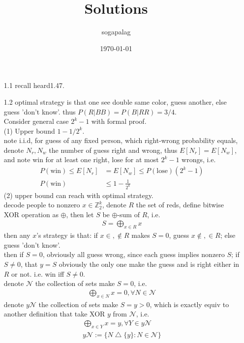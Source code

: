 \documentclass[paper=a4, fontsize=11pt]{scrartcl} %
\title{Solutions}
\author{sogapalag}
\date{\normalsize\today}
\numberwithin{equation}{section} %
\numberwithin{figure}{section} %
\numberwithin{table}{section} %
\begin{document}
\maketitle

\begin{itemize}
	\item[1.1] recall heard1.47.
	\item[1.2] optimal strategy is that one see double same color, guess another, else guess 'don't know'. thus $P(R|BB)=P(B|RR) = 3/4$.\\
	Consider general case $2^k -1$ with formal proof.\\
	(1) Upper bound $1 - 1/2^k$.\\
	note i.i.d, for guess of any fixed person, which right-wrong probability equals, denote $N_r,N_w$ the number of guess right and wrong, thus $E[N_r]=E[N_w]$, and note win for at least one right, lose for at most $2^k-1$ wrongs, i.e.
	\begin{align}
		P(\text{win}) \leq E[N_r] &= E[N_w] \leq P(\text{lose}) (2^k-1)\\
		P(\text{win}) &\leq  1 - \frac{1}{2^k}
	\end{align}
	(2) upper bound can reach with optimal strategy.\\
	decode people to nonzero $x\in \mathbb{Z}_2^k$, denote $R$ the set of reds, define bitwise XOR operation as $\oplus$, then let $S$ be $\oplus$-sum of $R$, i.e. 
	\begin{align}
		S = \bigoplus_{x\in R} x
	\end{align}
	then any $x$'s strategy is that: if $x\in,\notin R$ makes $S=0$, guess $x\notin,\in R$; else guess 'don't know'.\\
	then if $S=0$, obviously all guess wrong, since each guess implies nonzero $S$; if $S\neq 0$, that $y=S$ obviously the only one make the guess and is right either in $R$ or not. i.e. win iff $S\neq 0$.\\
	denote $\mathcal{N}$ the collection of sets make $S=0$, i.e.
	\begin{align}
		\bigoplus_{x\in N} x = 0, \forall N\in \mathcal{N}
	\end{align}
	denote $y\mathcal{N}$ the collection of sets make $S=y>0$, which is exactly equiv to another definition that take XOR $y$ from $\mathcal{N}$, i.e.
	\begin{align}
		 \bigoplus_{x\in Y} x = y, \forall Y\in y\mathcal{N}\\
		 y\mathcal{N}:=\{N\bigtriangleup \{y\}: N\in\mathcal{N}\}
	\end{align}

\end{itemize}
\end{document}
